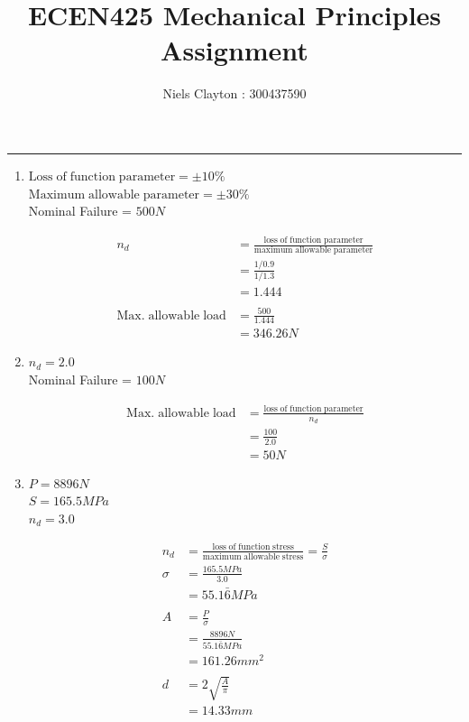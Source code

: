 \documentclass[a4paper,11pt]{article}
\begin{document}
\title{\LARGE{\textbf{ECEN425 Mechanical Principles Assignment}}}
\author{Niels Clayton : 300437590}
\date{}
\maketitle
\hrule

\begin{enumerate}
   
    \item 
    $ \mathrm{Loss \; of \; function \; parameter} = \pm10\% $ \\
    $\mathrm{Maximum \; allowable \; parameter} = \pm30\%$\\
    Nominal Failure = $500N$

    \begin{align*}
        n_d&=\frac{\mathrm{loss \; of \; function \; parameter}}{\mathrm{maximum \; allowable \; parameter}}\\
        &= \frac{1/0.9}{1/1.3} \\
        &= 1.444\\\\
        \mathrm{Max. \; allowable \; load} &= \frac{500}{1.444} \\
        &= 346.26N
    \end{align*}

    \item 
    $n_d = 2.0$ \\
    Nominal Failure = $100N$
    
    \begin{align*}
        \mathrm{Max. \; allowable \; load} &= \frac{\mathrm{loss \; of \; function \; parameter}}{n_d}\\
        &= \frac{100}{2.0} \\
        &= 50N
    \end{align*}

    \item 
    $P = 8896N$\\
    $S = 165.5MPa$\\
    $n_d = 3.0$        

    \begin{align*}
        n_d&=\frac{\mathrm{loss \; of \; function \; stress}}{\mathrm{maximum \; allowable \; stress}} = \frac{S}{\sigma}\\
        \sigma &= \frac{165.5MPa}{3.0}\\
        &= 55.1\bar{6}MPa\\\\
        A &= \frac{P}{\sigma}\\
        &= \frac{8896N}{55.1\bar{6}MPa}\\
        &= 161.26mm^2\\\\
        d&= 2\sqrt{\frac{A}{\pi}}\\
        &= 14.33mm
    \end{align*}


\end{enumerate}
\end{document}
